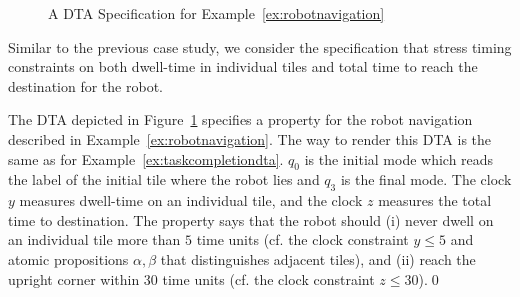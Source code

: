 \begin{figure}
\centering
{}
\caption{A DTA Specification for Example~\ref{ex:robotnavigation}}
\label{fig:dtarobotnavigation}
\end{figure}

Similar to the previous case study, we consider the specification that stress timing constraints on both dwell-time in individual tiles and total time to reach the destination for the robot.
\vspace{-0.5em}
\begin{example}
The DTA depicted in Figure~\ref{fig:dtarobotnavigation} specifies a property for the robot navigation described in Example~\ref{ex:robotnavigation}.
The way to render this DTA is the same as for Example~\ref{ex:taskcompletiondta}.
$q_0$ is the initial mode which reads the label of the initial tile where the robot lies and $q_3$ is the final mode.
The clock $y$ measures dwell-time on an individual tile, and the clock $z$ measures the total time to destination.
The property says that the robot should (i) never dwell on an individual tile more than $5$ time units (cf. the clock constraint $y\le 5$ and atomic propositions $\alpha,\beta$ that distinguishes adjacent tiles), and (ii) reach the upright corner within 30 time units (cf. the clock constraint $z\le 30$).\qed
\end{example}
\vspace{-0.8em}